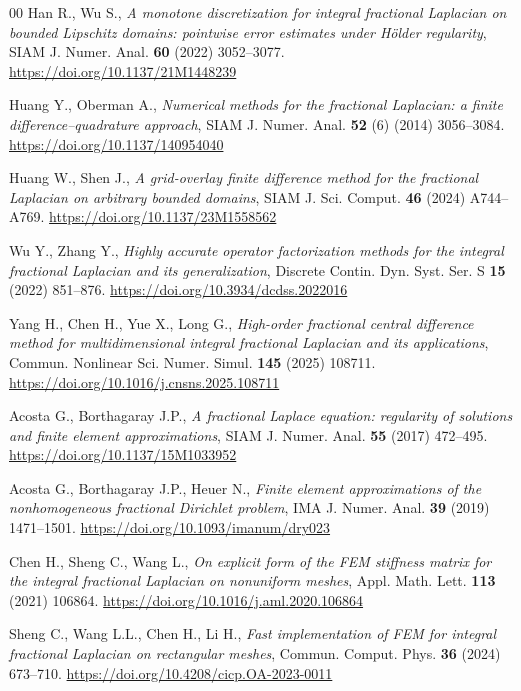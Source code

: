 \documentclass[reqno]{amsart}
\begin{document}
\begin{thebibliography}{00}
Han R., Wu S., \textit{A monotone discretization for integral fractional Laplacian on bounded Lipschitz domains: pointwise error estimates under Hölder regularity}, SIAM J. Numer. Anal. \textbf{60} (2022) 3052--3077.
\url{https://doi.org/10.1137/21M1448239}

Huang Y., Oberman A., \textit{Numerical methods for the fractional Laplacian: a finite difference–quadrature approach}, SIAM J. Numer. Anal. \textbf{52} (6) (2014) 3056--3084.
\url{https://doi.org/10.1137/140954040}

Huang W., Shen J., \textit{A grid-overlay finite difference method for the fractional Laplacian on arbitrary bounded domains}, SIAM J. Sci. Comput. \textbf{46} (2024) A744--A769.
\url{https://doi.org/10.1137/23M1558562}

Wu Y., Zhang Y., \textit{Highly accurate operator factorization methods for the integral fractional Laplacian and its generalization}, Discrete Contin. Dyn. Syst. Ser. S \textbf{15} (2022) 851--876.
\url{https://doi.org/10.3934/dcdss.2022016}

Yang H., Chen H., Yue X., Long G., \textit{High-order fractional central difference method for multidimensional integral fractional Laplacian and its applications}, Commun. Nonlinear Sci. Numer. Simul. \textbf{145} (2025) 108711.
\url{https://doi.org/10.1016/j.cnsns.2025.108711}

Acosta G., Borthagaray J.P., \textit{A fractional Laplace equation: regularity of solutions and finite element approximations}, SIAM J. Numer. Anal. \textbf{55} (2017) 472--495. \url{https://doi.org/10.1137/15M1033952}

Acosta G., Borthagaray J.P., Heuer N., \textit{Finite element approximations of the nonhomogeneous fractional Dirichlet problem}, IMA J. Numer. Anal. \textbf{39} (2019) 1471--1501. \url{https://doi.org/10.1093/imanum/dry023}

Chen H., Sheng C., Wang L., \textit{On explicit form of the FEM stiffness matrix for the integral fractional Laplacian on nonuniform meshes}, Appl. Math. Lett. \textbf{113} (2021) 106864. \url{https://doi.org/10.1016/j.aml.2020.106864}

Sheng C., Wang L.L., Chen H., Li H., \textit{Fast implementation of FEM for integral fractional Laplacian on rectangular meshes}, Commun. Comput. Phys. \textbf{36} (2024) 673--710. \url{https://doi.org/10.4208/cicp.OA-2023-0011}


\end{thebibliography}
\end{document}
